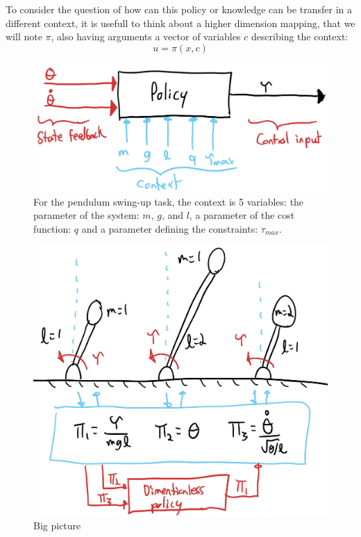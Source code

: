 To consider the question of how can this policy or knowledge can be transfer in a different context, it is usefull to think about a higher dimension mapping, that we will note $\pi$, also having arguments a vector of variables $c$ describing the context:
\begin{equation}
u
=
\pi \left(
x,
c
\right)
\end{equation}



\begin{figure}[H]
\vspace{-5pt}
\begin{center}
\includegraphics[width=0.75\linewidth]{fig/policy_context.jpg}
\caption{For the pendulum swing-up task, the context is 5 variables: the parameter of the system: $m$, $g$, and $l$, a parameter of the cost function: $q$ and a parameter defining the constraints: $\tau_{max}$.
}\label{fig:policy_context}
\end{center}
\vspace{-5pt}
\end{figure}

\begin{figure}[t]
\vspace{-5pt}
\begin{center}
\includegraphics[width=0.99\linewidth]{fig/big_picture.jpg}
\caption{Big picture}\label{fig:big_picture}
\end{center}
\vspace{-15pt}
\end{figure}

